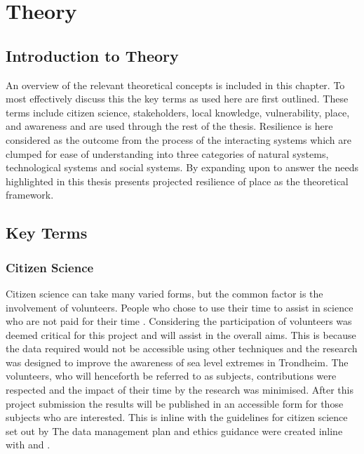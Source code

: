 
\chapter{Theory}

\section{Introduction to Theory}
An overview of the relevant theoretical concepts is included in this chapter. To most effectively discuss this the key terms as used here are first outlined. These terms include citizen science, stakeholders, local knowledge, vulnerability, place, and awareness and are used through the rest of the thesis. Resilience is here considered as the outcome from the process of the interacting systems which are clumped for ease of understanding into three categories of natural systems, technological systems and social systems. By expanding upon \cite{cutter_place-based_2008} to answer the needs highlighted in \cite{rasanen_conceptualizing_2020} this thesis presents projected resilience of place as the theoretical framework. 


\section{Key Terms}

\subsection{Citizen Science}
Citizen science can take many varied forms, but the common factor is the involvement of volunteers. People who chose to use their time to assist in science who are not paid for their time \cite{pocock_choosing_2014}. Considering \cite{tweddle_guide_2012} the participation of volunteers was deemed critical for this project and will assist in the overall aims. This is because the data required would not be accessible using other techniques and the research was designed to improve the awareness of sea level extremes in Trondheim. The volunteers, who will henceforth be referred to as subjects, contributions were respected and the impact of their time by the research was minimised. After this project submission the results will be published in an accessible form for those subjects who are interested. This is inline with the guidelines for citizen science set out by \cite{tweddle_guide_2012} The data management plan and ethics guidance were created inline with \cite{nesh_guidelines_2022} and \cite{nsd_norsk_nodate}.



